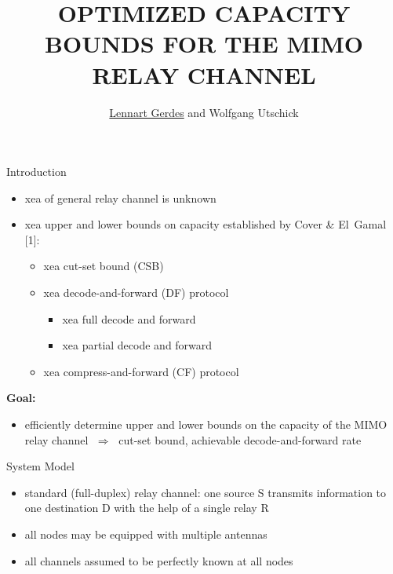 \documentclass[a0,landscape,3col,print]{msvposter}
\newcommand{\marked}[1]{#1}
\begin{document}
\author{\underline{Lennart Gerdes} and Wolfgang Utschick}
\title{OPTIMIZED CAPACITY BOUNDS FOR THE MIMO RELAY CHANNEL} %


\begin{poster}
\begin{postercolumn}

\begin{posterbox}{Introduction}
    \begin{itemize}\itemsep7mm
        \item xea of general relay channel is unknown
        \item xea upper and lower bounds on capacity established by Cover \& El~Gamal \marked{[1]}:
        \begin{itemize}
            \item xea cut-set bound (CSB)
            \item xea decode-and-forward (DF) protocol
            \begin{itemize}
                \item xea full decode and forward
                \item xea partial decode and forward
            \end{itemize}
            \item xea compress-and-forward (CF) protocol
        \end{itemize}
    \end{itemize}
    \vspace{1cm}

{\Large \textcolor{TUMOrange}{\textbf{Goal:}}}
    \begin{itemize}
        \item efficiently determine upper and lower bounds on the capacity of the MIMO relay channel $\; \Rightarrow \;$ \textcolor{TUMOrange}{cut-set bound, achievable decode-and-forward rate}
    \end{itemize}
\end{posterbox}

\begin{posterbox}{System Model}
    \begin{itemize}\itemsep7mm
        \item standard (full-duplex) relay channel: one source S transmits information to one destination D with the help of a single relay R
        \item all nodes may be equipped with multiple antennas
        \item all channels assumed to be perfectly known at all nodes
    \end{itemize}


\end{posterbox}
\end{postercolumn}
\end{poster}
\end{document}
